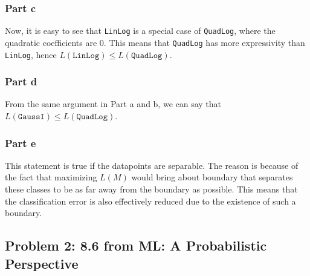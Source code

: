 \documentclass{article}
\begin{document}
\subsubsection*{Part c}
\begin{flushleft}
Now, it is easy to see that \texttt{LinLog} is a special case of \texttt{QuadLog}, where the quadratic coefficients are 0. This means that \texttt{QuadLog} has more expressivity than \texttt{LinLog}, hence \(L(\texttt{LinLog}) \leq L(\texttt{QuadLog})\).
\end{flushleft}

\subsubsection*{Part d}
\begin{flushleft}
From the same argument in Part a and b, we can say that \(L(\texttt{GaussI}) \leq L(\texttt{QuadLog})\).
\end{flushleft}

\subsubsection*{Part e}
\begin{flushleft}
This statement is true if the datapoints are separable. The reason is because of the fact that maximizing \(L(M)\) would bring about boundary that separates these classes to be as far away from the boundary as possible. This means that the classification error is also effectively reduced due to the existence of such a boundary.
\end{flushleft}

\subsection*{Problem 2: 8.6 from ML: A Probabilistic Perspective}
\end{document}
